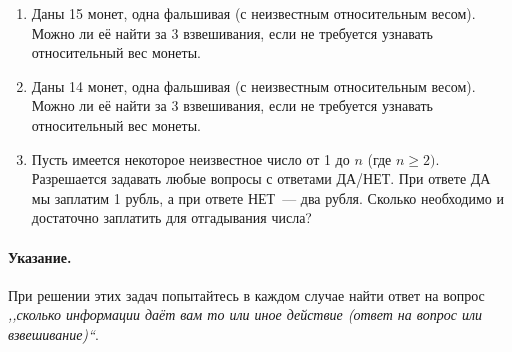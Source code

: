 \documentclass[a4paper]{article}
\begin{document}
\begin{enumerate}
    \item Даны 15 монет, одна фальшивая (с неизвестным относительным весом). Можно ли её найти за 3 взвешивания, если не требуется узнавать относительный вес монеты.
        
    \item Даны 14 монет, одна фальшивая (с неизвестным относительным весом). Можно ли её найти за 3 взвешивания, если не требуется узнавать относительный вес монеты.
        
    \item Пусть имеется некоторое неизвестное число от 1 до \(n\) (где \(n\ge2)\).
    Разрешается задавать любые вопросы с ответами ДА/НЕТ. При ответе ДА мы
    заплатим 1 рубль, а при ответе НЕТ~— два рубля. Сколько необходимо и достаточно заплатить для отгадывания числа?
    
\end{enumerate}

\paragraph{Указание.} При решении этих задач попытайтесь в каждом случае найти ответ на вопрос \emph{,,сколько информации даёт вам то или иное действие (ответ на вопрос или взвешивание)``}.
    
\end{document}
